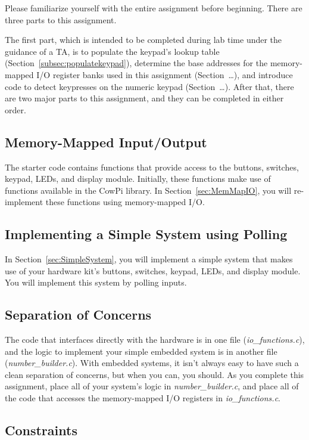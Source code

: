 Please familiarize yourself with the entire assignment before beginning.
There are three parts to this assignment.

The first part, which is intended to be completed during lab time under the guidance of a TA, is to populate the keypad's lookup table (Section~\ref{subsec:populatekeypad}), determine the base addresses for the memory-mapped I/O register banks used in this assignment (Section~\dots), and introduce code to detect keypresses on the numeric keypad (Section~\dots).
After that, there are two major parts to this assignment, and they can be completed in either order.

\subsection{Memory-Mapped Input/Output}

The starter code contains functions that provide access to the buttons, switches, keypad, LEDs, and display module.
Initially, these functions make use of functions available in the CowPi library.
In Section~\ref{sec:MemMapIO}, you will re-implement these functions using memory-mapped I/O\@.

\subsection{Implementing a Simple System using Polling}

In Section~\ref{sec:SimpleSystem}, you will implement a simple system that makes use of your hardware kit's buttons, switches, keypad, LEDs, and display module.
You will implement this system by polling inputs.

\subsection{Separation of Concerns}

The code that interfaces directly with the hardware is in one file (\textit{io\_functions.c}), and the logic to implement your simple embedded system is in another file (\textit{number\_builder.c}).
With embedded systems, it isn't always easy to have such a clean separation of concerns, but when you can, you should.
As you complete this assignment, place all of your system's logic in \textit{number\_builder.c},
and place all of the code that accesses the memory-mapped I/O registers in \textit{io\_functions.c}.

\subsection{Constraints} \label{subsec:constraints}

